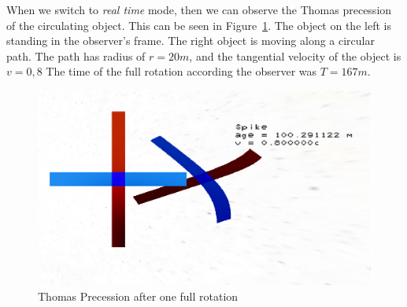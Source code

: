 \documentclass{egpubl}
\begin{document}
When we switch to \emph{real time} mode, then we can observe the Thomas precession of the circulating object. This can be seen in Figure~\ref{fig:thomasPrec}. The object on the left is standing in the observer's frame. The right object is moving along a circular path. The path has radius of $r=20m$, and the tangential velocity of the object is $v=0,8$
The time of the full rotation according the observer was $T=167m$.
\begin{figure}[htb]
  	\centering
	\includegraphics[width=.95\linewidth]{figures/ThomasPrecession.eps}
	\caption{Thomas Precession after one full rotation}
	\label{fig:thomasPrec}
\end{figure}

\FloatBarrier
\end{document}

